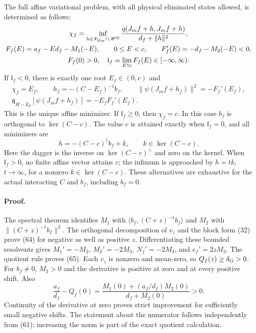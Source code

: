 \documentclass[11pt]{article}
\newcommand{\HH}{\mathscr H}
\newcommand{\VV}{\mathscr V}
\begin{document}
The full affine variational problem, with all physical eliminated
states allowed, is determined as follows:
\begin{gather}
 \chi_f=\inf_{h\in\VV_{Q_m}\cap\HH^{\rm G}}
           \frac{q(J_mf+h,J_mf+h)}{d_f+\|h\|^2},\nonumber\\
 F_f(E)=a_f-E d_f-M_1(-E),\qquad 0\leq E<c,\qquad
 F_f'(E)=-d_f-M_2(-E)<0,\label{eq:affineroot}\\
 F_f(0)>0,\quad
 \mathfrak l_f=\lim_{E\uparrow c}F_f(E)\in[-\infty,\infty).\nonumber
\end{gather}
If $\mathfrak l_f<0$, there is exactly one root $E_f\in(0,c)$ and
\begin{gather}
 \chi_f=E_f,\qquad
 h_f=-(C-E_f)^{-1}b_f,\qquad
 \|\psi(J_mf+h_f)\|^2=-F_f'(E_f),\nonumber\\
 \mathfrak q_{H-E_0}[\psi(J_mf+h_f)]=-E_fF_f'(E_f).
 \label{eq:affineattain}
\end{gather}
This is the unique affine minimizer. If $\mathfrak l_f\geq0$, then
$\chi_f=c$. In this case $b_f$ is orthogonal to $\ker(C-c)$.
The value $c$ is attained exactly when $\mathfrak l_f=0$, and all
minimizers are
\begin{equation}\label{eq:boundaryattain}
 h=-(C-c)^\dagger b_f+k,\qquad k\in\ker(C-c).
\end{equation}
Here the dagger is the inverse on $\ker(C-c)^\perp$ and zero on the
kernel. When $\mathfrak l_f>0$, no finite affine vector attains $c$;
the infimum is approached by $h=t k$, $t\to\infty$, for a nonzero
$k\in\ker(C-c)$. These alternatives are exhaustive for the actual
interacting $C$ and $b_f$, including $b_f=0$.

\paragraph{Proof.}
The spectral theorem identifies $M_1$ with
$\langle b_f,(C+z)^{-1}b_f\rangle$ and $M_2$ with
$\|(C+z)^{-1}b_f\|^2$. The orthogonal decomposition of $v_z$ and
the block form (32) prove (64)
for negative as well as positive $z$. Differentiating these bounded
resolvents gives $M_1'=-M_2$, $M_2'=-2M_3$,
$N_f'=-2M_3$, and $e_f'=2zM_3$. The quotient rule proves
(65). Each $v_z$ is nonzero and mean-zero,
so $Q_f(z)\geq\delta_{\rm G}>0$.
For $b_f\ne0$, $M_3>0$ and the derivative is positive at zero
and at every positive shift. Also
\[
 \frac{a_f}{d_f}-Q_f(0)
 =\frac{M_1(0)+(a_f/d_f)M_2(0)}{d_f+M_2(0)}>0 .
\]
Continuity of the derivative at zero proves strict improvement for
sufficiently small negative shifts. The statement about the numerator
follows independently from (61); increasing the
norm is part of the exact quotient calculation.
\end{document}
